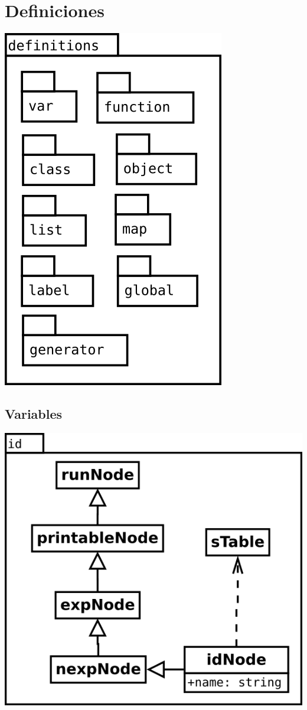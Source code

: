 \section {Definiciones}
\begin{center}
\includegraphics[scale=0.4]{definitions.png} \\
\end{center}

\subsection {Variables}
\begin{center}
\includegraphics[scale=0.4]{id.png} \\
\end{center}

